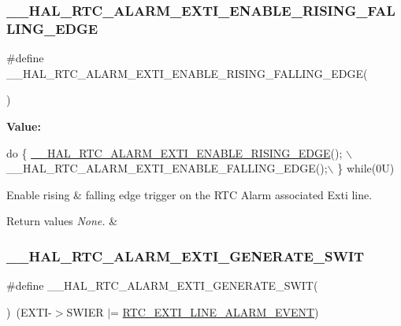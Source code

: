 \subsubsection{\texorpdfstring{\+\_\+\+\_\+\+H\+A\+L\+\_\+\+R\+T\+C\+\_\+\+A\+L\+A\+R\+M\+\_\+\+E\+X\+T\+I\+\_\+\+E\+N\+A\+B\+L\+E\+\_\+\+R\+I\+S\+I\+N\+G\+\_\+\+F\+A\+L\+L\+I\+N\+G\+\_\+\+E\+D\+GE}{\_\_HAL\_RTC\_ALARM\_EXTI\_ENABLE\_RISING\_FALLING\_EDGE}}
{\footnotesize\ttfamily \#define \+\_\+\+\_\+\+H\+A\+L\+\_\+\+R\+T\+C\+\_\+\+A\+L\+A\+R\+M\+\_\+\+E\+X\+T\+I\+\_\+\+E\+N\+A\+B\+L\+E\+\_\+\+R\+I\+S\+I\+N\+G\+\_\+\+F\+A\+L\+L\+I\+N\+G\+\_\+\+E\+D\+GE(\begin{DoxyParamCaption}{ }\end{DoxyParamCaption})}

{\bfseries Value\+:}
\begin{DoxyCode}
\textcolor{keywordflow}{do} \{ \hyperlink{group___r_t_c___exported___macros_ga9d6c820076d2e583f6354f4e37217d1b}{\_\_HAL\_RTC\_ALARM\_EXTI\_ENABLE\_RISING\_EDGE}(); \(\backslash\)
                                                               \_\_HAL\_RTC\_ALARM\_EXTI\_ENABLE\_FALLING\_EDGE();\(\backslash\)
                                                             \} \textcolor{keywordflow}{while}(0U)
\end{DoxyCode}


Enable rising \& falling edge trigger on the R\+TC Alarm associated Exti line. 


\begin{DoxyRetVals}{Return values}
{\em None.} & \\
\hline
\end{DoxyRetVals}
\mbox{\label{group___r_t_c___exported___macros_ga0ea6a0ad763bcc1913468b57f3972cb2}} 
\subsubsection{\texorpdfstring{\+\_\+\+\_\+\+H\+A\+L\+\_\+\+R\+T\+C\+\_\+\+A\+L\+A\+R\+M\+\_\+\+E\+X\+T\+I\+\_\+\+G\+E\+N\+E\+R\+A\+T\+E\+\_\+\+S\+W\+IT}{\_\_HAL\_RTC\_ALARM\_EXTI\_GENERATE\_SWIT}}
{\footnotesize\ttfamily \#define \+\_\+\+\_\+\+H\+A\+L\+\_\+\+R\+T\+C\+\_\+\+A\+L\+A\+R\+M\+\_\+\+E\+X\+T\+I\+\_\+\+G\+E\+N\+E\+R\+A\+T\+E\+\_\+\+S\+W\+IT(\begin{DoxyParamCaption}{ }\end{DoxyParamCaption})~(E\+X\+TI-\/$>$S\+W\+I\+ER $\vert$= \hyperlink{group___r_t_c___private___constants_gaeffe9b89372b06df1c0eff2f4346682b}{R\+T\+C\+\_\+\+E\+X\+T\+I\+\_\+\+L\+I\+N\+E\+\_\+\+A\+L\+A\+R\+M\+\_\+\+E\+V\+E\+NT})}



